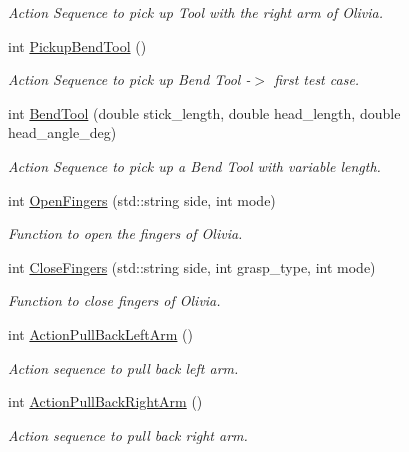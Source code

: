 \begin{DoxyCompactItemize}
\begin{DoxyCompactList}\small\item\em Action Sequence to pick up Tool with the right arm of Olivia. \end{DoxyCompactList}\item 
int \hyperlink{structManipulate_aba8393a0211102ece9e667969dc20102}{Pickup\+Bend\+Tool} ()
\begin{DoxyCompactList}\small\item\em Action Sequence to pick up Bend Tool -\/$>$ first test case. \end{DoxyCompactList}\item 
int \hyperlink{structManipulate_a4e119e64742c41a9c460f9a6f7dbca66}{Bend\+Tool} (double stick\+\_\+length, double head\+\_\+length, double head\+\_\+angle\+\_\+deg)
\begin{DoxyCompactList}\small\item\em Action Sequence to pick up a Bend Tool with variable length. \end{DoxyCompactList}\item 
int \hyperlink{structManipulate_a9773bc419a59c54669e7ace7b1c71860}{Open\+Fingers} (std\+::string side, int mode)
\begin{DoxyCompactList}\small\item\em Function to open the fingers of Olivia. \end{DoxyCompactList}\item 
int \hyperlink{structManipulate_ad3176a1acd09b15e80a5455b4df47515}{Close\+Fingers} (std\+::string side, int grasp\+\_\+type, int mode)
\begin{DoxyCompactList}\small\item\em Function to close fingers of Olivia. \end{DoxyCompactList}\item 
int \hyperlink{structManipulate_ad24d102e05574988b0d5410f72af55d9}{Action\+Pull\+Back\+Left\+Arm} ()
\begin{DoxyCompactList}\small\item\em Action sequence to pull back left arm. \end{DoxyCompactList}\item 
int \hyperlink{structManipulate_aad9e6bf0e8c675cdc6a516effcaca20c}{Action\+Pull\+Back\+Right\+Arm} ()
\begin{DoxyCompactList}\small\item\em Action sequence to pull back right arm. \end{DoxyCompactList}\item 

\end{DoxyCompactItemize}
